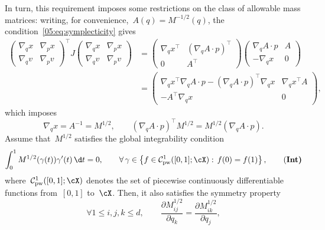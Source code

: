 In turn, this requirement imposes some restrictions on the class of allowable mass matrices: writing, for convenience,~$A(q)=M^{-1/2}(q)$, the condition~\eqref{05:eq:symplecticity} gives
\begin{equation}
    \begin{aligned}
    \begin{pmatrix}
        \nabla_q x & \nabla_p x \\ \nabla_q v & \nabla_p v
    \end{pmatrix}^\top J \begin{pmatrix}
        \nabla_q x & \nabla_p x \\ \nabla_q v & \nabla_p v
    \end{pmatrix} &= \begin{pmatrix}
    \nabla_q x^\top & \left(\nabla_q A\cdot p\right)^\top \\ 0 & A^\top
    \end{pmatrix}\begin{pmatrix}\nabla_q A \cdot p & A\\ -\nabla_q x & 0\end{pmatrix}\\
    &=\begin{pmatrix}
        \nabla_q x^\top\nabla_q A\cdot p-\left(\nabla_q A\cdot p\right)^\top\nabla_q x & \nabla_q x^\top A\\ - A^\top\nabla_q x & 0
    \end{pmatrix},
\end{aligned}
\end{equation}
which imposes
\begin{equation}
    \label{05:eq:x_gradient_condition}
    \nabla_q x = A^{-1}=M^{1/2}, \qquad \left(\nabla_q A\cdot p\right)^\top M^{1/2} = M^{1/2}\left(\nabla_q A\cdot p\right).
\end{equation}
Assume that~$M^{1/2}$ satisfies the global integrability condition
\begin{equation}
    \label{05:eq:global_integrability_condition}
    \int_0^1 M^{1/2}(\gamma(t))\gamma'(t)\,\d t = 0,\qquad\forall\,\gamma\in\left\{f\in\mathcal C_{\mathrm{pw}}^1([0,1];\cX):\,f(0)=f(1)\right\},\tag{\bf Int}
\end{equation}
where~$\mathcal C_{\mathrm{pw}}^1([0,1];\cX)$ denotes the set of piecewise continuously differentiable functions from~$[0,1]$ to~$\cX$.
Then, it also satisfies the symmetry property
\begin{equation}
    \label{05:eq:integrability_condition}
    \forall 1\leq i,j,k \leq d,\qquad \frac{\partial M_{ij}^{1/2}}{\partial q_k} = \frac{\partial M_{ik}^{1/2}}{\partial q_j},\tag{\bf Sym}
\end{equation}
